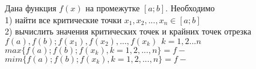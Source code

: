 Дана функция $f(x)$ на промежутке $[a;b]$. Необходимо \\
1) найти все критические точки $x_{1}, x_{2}, ..., x_{n} \in [a; b]$ \\
2) вычислить значения критических точек и крайних точек отрезка
$f(a), f(b); f(x_{1}), f(x_{2}), ..., f(x_{k}) ~~ k = 1, 2 ... n$ \\

$max \{f(a); f(b); f(x_{k}), k = 1, 2, ..., n\} = f - $ \\
$mim \{f(a); f(b); f(x_{k}), k = 1, 2, ..., n\} = f - $  \\